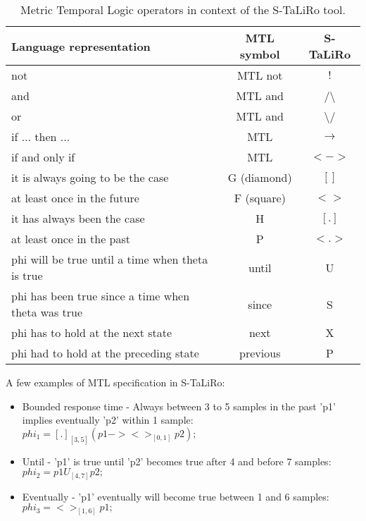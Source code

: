 \begin{table}[htb]
\begin{center}
\begin{tabular}{|p{9cm}|c|c|}
    \hline
    Language representation & MTL symbol & S-TaLiRo\\
    \hline
    not & MTL not & $!$ \\
    \hline    
    and & MTL and & /\textbackslash \\
    \hline
    or & MTL and & \textbackslash/ \\
    \hline
    if ... then ... & MTL &$\rightarrow$ \\
    \hline
    if and only if & MTL & $<->$ \\
    \hline
    it is always going to be the case & G (diamond) & $[ ]$ \\
    \hline
    at least once in the future & F (square) & $< >$ \\
    \hline
    it has always been the case & H & $[ . ]$ \\
    \hline
    at least once in the past & P & $< . >$ \\
    \hline
    phi will be true until a time when theta is true & until & U \\
    \hline
    phi has been true since a time when theta was true & since & S \\
    \hline
    phi has to hold at the next state & next & X \\
    \hline
    phi had to hold at the preceding state & previous & P \\
    \hline
\end{tabular}
\end{center}
\caption{Metric Temporal Logic operators in context of the S-TaLiRo tool.}
\label{tab.MTLsTaLiRo}
\end{table}

A few examples of MTL specification in S-TaLiRo:

\begin{itemize}
    \item Bounded response time - Always between 3 to 5 samples in the past 'p1' implies eventually 'p2' within 1 sample: $phi_1 = [.]_[3,5](p1 -> <>_[0,1] p2);$
    \item Until - 'p1' is true until 'p2' becomes true after 4 and before 7 samples: $phi_2 = p1 U_[4,7] p2;$
    \item Eventually - 'p1' eventually will become true between 1 and 6 samples: $phi_3 = <>_[1,6] p1;$
\end{itemize}

